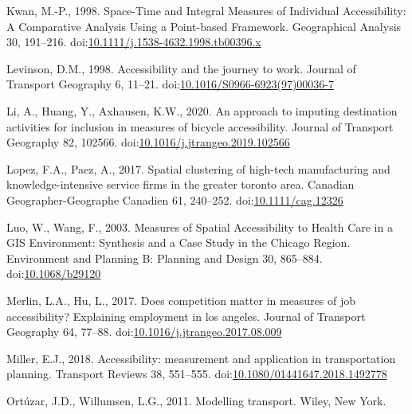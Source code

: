 \documentclass[]{elsarticle} %
\newlength{\cslhangindent}
\newlength{\cslentryspacingunit} %
\newenvironment{CSLReferences}[2] %
 {%
  \setlength{\parindent}{0pt}
  \ifodd #1
  \let\oldpar\par
  \def\par{\hangindent=\cslhangindent\oldpar}
  \fi
  \setlength{\parskip}{#2\cslentryspacingunit}
 }%
 {}
\begin{document}
\begin{CSLReferences}{1}{0}
\leavevmode{}%
Kwan, M.-P., 1998. Space-{Time} and {Integral} {Measures} of
{Individual} {Accessibility}: {A} {Comparative} {Analysis} {Using} a
{Point}-based {Framework}. Geographical Analysis 30, 191--216.
doi:\href{https://doi.org/10.1111/j.1538-4632.1998.tb00396.x}{10.1111/j.1538-4632.1998.tb00396.x}

\leavevmode{}%
Levinson, D.M., 1998. Accessibility and the journey to work. Journal of
Transport Geography 6, 11--21.
doi:\href{https://doi.org/10.1016/S0966-6923(97)00036-7}{10.1016/S0966-6923(97)00036-7}

\leavevmode{}%
Li, A., Huang, Y., Axhausen, K.W., 2020. An approach to imputing
destination activities for inclusion in measures of bicycle
accessibility. Journal of Transport Geography 82, 102566.
doi:\href{https://doi.org/10.1016/j.jtrangeo.2019.102566}{10.1016/j.jtrangeo.2019.102566}

\leavevmode{}%
Lopez, F.A., Paez, A., 2017. Spatial clustering of high-tech
manufacturing and knowledge-intensive service firms in the greater
toronto area. Canadian Geographer-Geographe Canadien 61, 240--252.
doi:\href{https://doi.org/10.1111/cag.12326}{10.1111/cag.12326}

\leavevmode{}%
Luo, W., Wang, F., 2003. Measures of Spatial Accessibility to Health
Care in a GIS Environment: Synthesis and a Case Study in the Chicago
Region. Environment and Planning B: Planning and Design 30, 865--884.
doi:\href{https://doi.org/10.1068/b29120}{10.1068/b29120}

\leavevmode{}%
Merlin, L.A., Hu, L., 2017. Does competition matter in measures of job
accessibility? Explaining employment in los angeles. Journal of
Transport Geography 64, 77--88.
doi:\href{https://doi.org/10.1016/j.jtrangeo.2017.08.009}{10.1016/j.jtrangeo.2017.08.009}

\leavevmode{}%
Miller, E.J., 2018. Accessibility: measurement and application in
transportation planning. Transport Reviews 38, 551--555.
doi:\href{https://doi.org/10.1080/01441647.2018.1492778}{10.1080/01441647.2018.1492778}

\leavevmode{}%
Ortúzar, J.D., Willumsen, L.G., 2011. Modelling transport. Wiley, New
York.


\end{CSLReferences}
\end{document}
